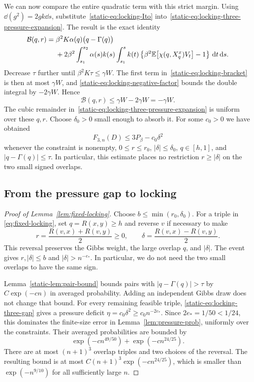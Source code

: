 We can now compare the entire quadratic term with this strict margin.
Using $\dd(g^2)=2gk\dd s$, substitute~\eqref{static-eq:locking-Ito}
into~\eqref{static-eq:locking-three-pressure-expansion}. The result is
the exact identity
\begin{equation}
\label{static-eq:locking-bracket}
 \begin{split}
 \mathcal B(q,r)
 ={}&\beta^2K\alpha(q)\bigl(q-\Gamma(q)\bigr)\\
 &+2\beta^2\int_{s_1}^{s_2}\alpha(s)k(s)
   \int_{s_1}^{s}k(t)
     \left\{\beta^2\mathbb E\bigl[\chi(q,X_q^x)V_t\bigr]-1\right\}
           \,\mathrm d t\,\mathrm d s.
 \end{split}
\end{equation}
Decrease $\tau$ further until $\beta^2K\tau\leq\gamma W$. The first
term in~\eqref{static-eq:locking-bracket} is then at most $\gamma W$, and
\eqref{static-eq:locking-negative-factor} bounds the double integral
by $-2\gamma W$. Hence
\[
 \mathcal B(q,r)\leq\gamma W-2\gamma W=-\gamma W.
\]
The cubic remainder in~\eqref{static-eq:locking-three-pressure-expansion}
is uniform over these $q,r$. Choose $\delta_0>0$ small enough to
absorb it. For some $c_0>0$ we have obtained
\begin{equation}
\label{static-eq:locking-three-gap}
 F_{3,n}(D)\leq3P_\beta-c_0\delta^2
\end{equation}
whenever the constraint is nonempty,
$0\leq r\leq r_0$, $|\delta|\leq\delta_0$, $q\in[h,1]$, and
$|q-\Gamma(q)|\leq\tau$. In particular, this estimate places no
restriction $r\geq|\delta|$ on the two small signed overlaps.

\subsection{From the pressure gap to locking}

\begin{proof}[Proof of Lemma~\ref{lem:fixed-locking}]
Choose $b\le\min(r_0,\delta_0)$. For a triple in
\eqref{eq:fixed-locking}, set $q=R(x,y)\ge h$ and reverse $v$ if
necessary to make
\[
 r=\frac{R(v,x)+R(v,y)}2\ge0,
 \qquad \delta=\frac{R(v,x)-R(v,y)}2.
\]
This reversal preserves the Gibbs weight, the large overlap $q$, and
$|\delta|$. The event gives $r,|\delta|\le b$ and
$|\delta|>n^{-e_*}$. In particular, we do not need the two small
overlaps to have the same sign.

Lemma~\ref{static-lem:pair-bound} bounds pairs with
$|q-\Gamma(q)|>\tau$ by $C\exp(-cn)$ in averaged probability.
Adding an independent Gibbs draw does not change that bound.
For every remaining feasible triple,
\eqref{static-eq:locking-three-gap} gives a pressure deficit
$\eta=c_0\delta^2\ge c_0n^{-2e_*}$. Since
$2e_*=1/50<1/24$, this dominates the finite-size error in
Lemma~\ref{lem:pressure-prob}, uniformly over the constraints.
Their averaged probabilities are bounded by
\[
 \exp(-c n^{49/50})+\exp(-c n^{24/25}).
\]
There are at most $(n+1)^3$ overlap triples and two choices of the
reversal. The resulting bound is at most
$C(n+1)^3\exp(-c n^{24/25})$, which is smaller than
$\exp(-n^{9/10})$ for all sufficiently large $n$.
\end{proof}

